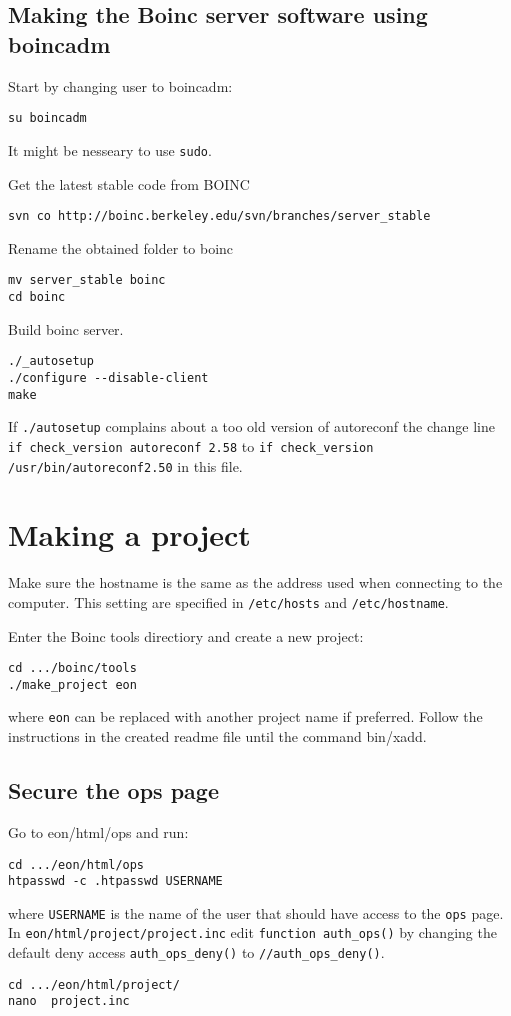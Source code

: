 \documentclass{article}
\begin{document}
\subsection{Making the Boinc server software using boincadm}
Start by changing user to boincadm:
\begin{verbatim}
su boincadm
\end{verbatim}
It might be nesseary to use \texttt{sudo}.

Get the latest stable code from BOINC
\begin{verbatim}
svn co http://boinc.berkeley.edu/svn/branches/server_stable
\end{verbatim}
%
Rename the obtained folder to boinc
\begin{verbatim}
mv server_stable boinc
cd boinc
\end{verbatim}
%
Build boinc server. 
\begin{verbatim}
./_autosetup   
./configure --disable-client
make 
\end{verbatim}
%
If \texttt{./autosetup} complains about a too old version of autoreconf the change line \texttt{if check\_version autoreconf 2.58} to \texttt{if check\_version /usr/bin/autoreconf2.50} in this file.
%
\section{Making a project}
Make sure the hostname is the same as the address used when connecting to the computer. This setting are specified in \texttt{/etc/hosts} and \texttt{/etc/hostname}.

Enter the Boinc tools directiory and create a new project:
\begin{verbatim}
cd .../boinc/tools
./make_project eon 
\end{verbatim}
where \texttt{eon} can be replaced with another project name if preferred.  
Follow the instructions in the created readme file until the command bin/xadd.

\subsection{Secure the ops page}
Go to eon/html/ops and run:
\begin{verbatim}
cd .../eon/html/ops
htpasswd -c .htpasswd USERNAME
\end{verbatim}
where \texttt{USERNAME} is the name of the user that should have access to the \texttt{ops} page.  
In \texttt{eon/html/project/project.inc} edit \texttt{function auth\_ops()} by changing the default deny access \texttt{auth\_ops\_deny()} to \texttt{//auth\_ops\_deny()}.
\begin{verbatim}
cd .../eon/html/project/
nano  project.inc
\end{verbatim}
\end{document}
